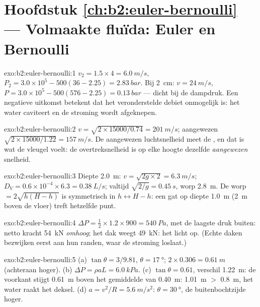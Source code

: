 \section*{Hoofdstuk \ref{ch:b2:euler-bernoulli} --- Volmaakte fluïda: Euler
en Bernoulli}

\begin{solution}{exo:b2:euler-bernoulli:1}
$v_2 = 1.5 \times 4 = \qty{6.0}{m/s}$,
$P_2 = 3.0 \times 10^5 - 500(36 - 2.25) =
\qty{2.83}{bar}$. Bij \qty{2}{cm}:
$v = \qty{24}{m/s}$,
$P = 3.0 \times 10^5 - 500
(576 - 2.25) = \qty{0.13}{bar}$ --- dicht bij de
dampdruk. Een negatieve uitkomst betekent dat het veronderstelde debiet
onmogelijk is: het water caviteert en de stroming wordt afgeknepen.
\end{solution}

\begin{solution}{exo:b2:euler-bernoulli:2}
$v = \sqrt{2 \times 15000/0.74} = \qty{201}{m/s}$; aangewezen
$\sqrt{2 \times 15000/
1.22} = \qty{157}{m/s}$. De aangewezen luchtsnelheid
meet de , en dat is wat de vleugel voelt: de overtreksnelheid
is op elke hoogte dezelfde \emph{aangewezen} snelheid.
\end{solution}

\begin{solution}{exo:b2:euler-bernoulli:3}
Diepte \qty{2.0}{m}: $v = \sqrt{2g \times 2} = \qty{6.3}{m/s}$;
$D_V = 0.6 \times 10^{-4}
\times 6.3 = \qty{0.38}{L/s}$; valtijd
$\sqrt{2/g} = \qty{0.45}{s}$, worp \qty{2.8}{m}. De worp
$= 2\sqrt{h(H - h)}$ is symmetrisch in $h \leftrightarrow H -
h$: een gat op
diepte \qty{1.0}{m} (\qty{2}{m} boven de vloer) treft hetzelfde punt.
\end{solution}

\begin{solution}{exo:b2:euler-bernoulli:4}
$\Delta P = \tfrac12 \times 1.2 \times 900 = \qty{540}{Pa}$, met de laagste
druk buiten: netto kracht \qty{54}{kN} \emph{omhoog}; het dak weegt
\qty{49}{kN}: het licht op. (Echte daken bezwijken eerst aan hun randen,
waar de stroming loslaat.)
\end{solution}

\begin{solution}{exo:b2:euler-bernoulli:5}
(a) $\tan\theta = 3/9.81$, $\theta = \qty{17}{\degree}$;
$2 \times 0.306 = \qty{0.61}{m}$ (achteraan hoger). (b)
$\Delta P = \rho aL = \qty{6.0}{kPa}$. (c) $\tan\theta =
0.61$, verschil
\qty{1.22}{m}: de voorkant stijgt \qty{0.61}{m} boven het gemiddelde van
\qty{0.40}{m}: \qty{1.01}{m} $>$ \qty{0.8}{m}, het water raakt het deksel.
(d) $a = v^2/R =
\qty{5.6}{m/s^2}$: $\theta = \qty{30}{\degree}$, de
buitenbochtzijde hoger.
\end{solution}

